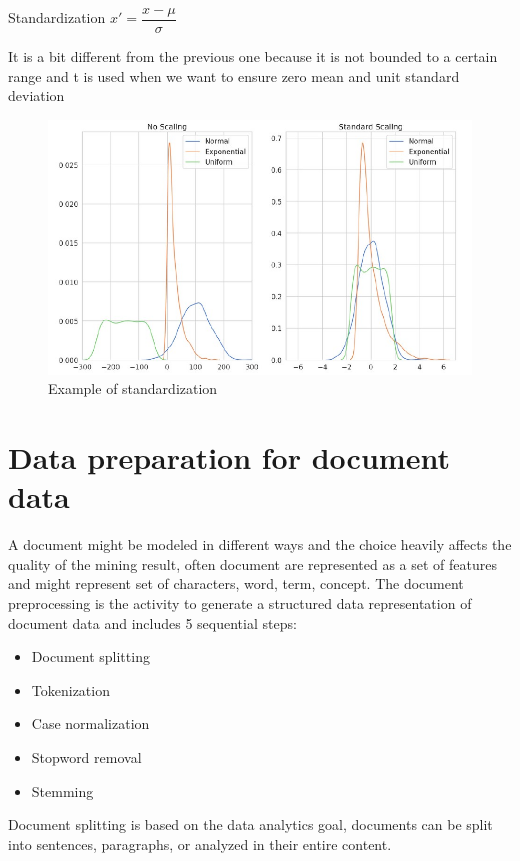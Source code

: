 \begin{center}
    Standardization  $x'= \dfrac{x- \mu}{\sigma}$
\end{center}

It is a bit different from the previous one because it is not bounded to a certain range and t is used when we want to ensure zero mean and unit standard deviation
\begin{figure}[H]
    \centering
    \includegraphics[scale=0.5]{images/Data pre-process/Standard.png}
    \caption{Example of standardization}
    \label{fig:enter-label}
\end{figure}

\section{Data preparation for document data}

A document might be modeled in different ways and the choice heavily affects the quality of the mining result, often document are represented as a set of features and might represent set of characters, word, term, concept. The document preprocessing is the activity to generate a structured data representation of document data and includes 5 sequential steps:
\begin{itemize}
    \item Document splitting
    \item Tokenization
    \item Case normalization
    \item Stopword removal
    \item Stemming
\end{itemize}
Document splitting is based on the data analytics goal, documents can be split into sentences, paragraphs, or analyzed in their entire content.

